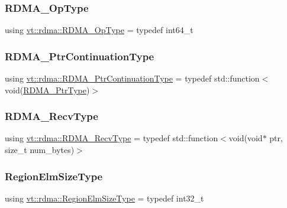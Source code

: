 \subsubsection{\texorpdfstring{R\+D\+M\+A\+\_\+\+Op\+Type}{RDMA\_OpType}}
{\footnotesize\ttfamily using \hyperlink{namespacevt_1_1rdma_a9b966d9780a2b41afe7cd7b7b4b20300}{vt\+::rdma\+::\+R\+D\+M\+A\+\_\+\+Op\+Type} = typedef int64\+\_\+t}

\mbox{\label{namespacevt_1_1rdma_a6e46099fefaf428990d215e6e6d12645}} 
\subsubsection{\texorpdfstring{R\+D\+M\+A\+\_\+\+Ptr\+Continuation\+Type}{RDMA\_PtrContinuationType}}
{\footnotesize\ttfamily using \hyperlink{namespacevt_1_1rdma_a6e46099fefaf428990d215e6e6d12645}{vt\+::rdma\+::\+R\+D\+M\+A\+\_\+\+Ptr\+Continuation\+Type} = typedef std\+::function$<$void(\hyperlink{namespacevt_a9e2c953286c7616f7c218e9951790776}{R\+D\+M\+A\+\_\+\+Ptr\+Type})$>$}

\mbox{\label{namespacevt_1_1rdma_aa07fa86d8eca8853254b40fc0e565726}} 
\subsubsection{\texorpdfstring{R\+D\+M\+A\+\_\+\+Recv\+Type}{RDMA\_RecvType}}
{\footnotesize\ttfamily using \hyperlink{namespacevt_1_1rdma_aa07fa86d8eca8853254b40fc0e565726}{vt\+::rdma\+::\+R\+D\+M\+A\+\_\+\+Recv\+Type} = typedef std\+::function$<$void(void$\ast$ ptr, size\+\_\+t num\+\_\+bytes)$>$}

\mbox{\label{namespacevt_1_1rdma_ac07ef96e399913495fde1da0f83f684c}} 
\subsubsection{\texorpdfstring{Region\+Elm\+Size\+Type}{RegionElmSizeType}}
{\footnotesize\ttfamily using \hyperlink{namespacevt_1_1rdma_ac07ef96e399913495fde1da0f83f684c}{vt\+::rdma\+::\+Region\+Elm\+Size\+Type} = typedef int32\+\_\+t}

